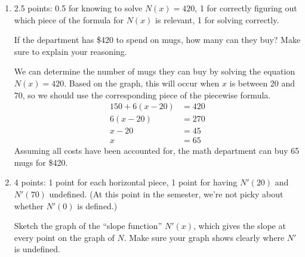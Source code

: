 \documentclass{article}
\begin{document}
\begin{enumerate}
\begin{enumerate}
\begin{solution}
      The cost of ordering 71 mugs should be \$455, since the first 20 mugs are \$7 each, the
      next 50 mugs are \$6 each, plus one mug at \$5 per mug, plus \$10 for shipping. This matches
      with the formula, since $N(71)=455$. 
    \end{solution}

  \item

    \begin{grading}
      2.5 points: 0.5 for knowing to solve $N(x) = 420$, 1 for correctly figuring out which piece of the formula for $N(x)$ is relevant, 1 for solving correctly. 
    \end{grading}

    \begin{problem}[\vfill]
      If the department has \$420 to spend on mugs, how many can they buy? Make sure to explain your reasoning. 
    \end{problem}

    \begin{solution}
      We can determine the number of mugs they can buy by solving the equation $N(x)=420$.
      Based on the graph, this will occur when $x$ is between 20 and 70, so we should use
      the corresponding piece of the piecewise formula.
      \begin{align*}
        150+6(x-20) &= 420 \\
        6(x-20) &= 270 \\
        x-20 &= 45 \\
        x &= 65
      \end{align*}
      Assuming all costs have been accounted for, the math department can buy 65 mugs for \$420.
    \end{solution}

  \item 

    \begin{grading} 
      4 points: 1 point for each horizontal piece, 1 point for having $N'(20)$ and $N'(70)$ undefined. (At this point in the semester, we're not picky about whether $N'(0)$ is defined.)
    \end{grading}

    \begin{problem}[\vfill]
      Sketch the graph of the ``slope function'' $N'(x)$, which gives the slope at every point on the graph of $N$. Make sure your graph shows clearly where $N'$ is undefined.
    \end{problem}


\end{enumerate}
\end{enumerate}
\end{document}
